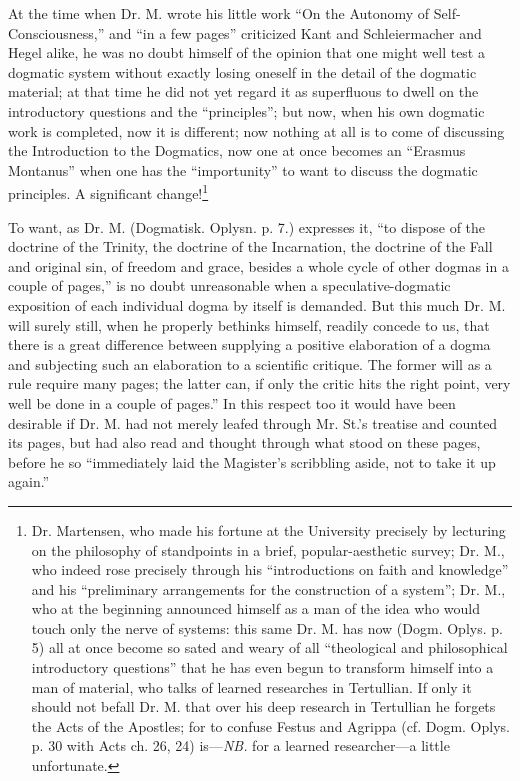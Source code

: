 \documentclass[12pt,a4paper,openany]{book}
\newcommand{\opage}[1]{\marginnote{\footnotesize\textit{[#1]}}}
\begin{document}
At the time when Dr. M. wrote his little work ``On the Autonomy
of Self-Consciousness,'' and ``in a few pages'' criticized
Kant and Schleiermacher and Hegel alike, he was no
doubt himself of the opinion that one might well test
a dogmatic system without exactly losing oneself in the detail of
the dogmatic material; at that time he did not yet regard it
as superfluous to dwell on the introductory questions
and the ``principles''; but now, when his own dogmatic
work is completed, now it is different; now nothing at all
is to come of discussing the Introduction to the Dogmatics,
now one at once becomes an ``Erasmus Montanus'' when one
has the ``importunity'' to want to discuss the dogmatic
principles. A significant change!\footnote[1]{Dr. Martensen, who made his fortune at the University precisely by lecturing on the philosophy of standpoints in a brief, popular-aesthetic survey; Dr. M., who indeed rose precisely through his ``introductions on faith and knowledge'' and his ``preliminary arrangements for the construction of a system''; Dr. M., who at the beginning announced himself as a man of the idea who would touch only the nerve of systems: this same Dr. M. has now (Dogm. Oplys. p. 5) all at once become so sated and weary of all ``theological and philosophical introductory questions'' that he has even begun to transform himself into a man of material, who talks of learned researches in Tertullian. If only it should not befall Dr. M. that over his deep research in Tertullian he forgets the Acts of the Apostles; for to confuse Festus and Agrippa (cf. Dogm. Oplys. p. 30 with Acts ch. 26, 24) is---\textit{NB.} for a learned researcher---a little unfortunate.} %

To want, as Dr. M. (Dogmatisk. Oplysn. p. 7.)
expresses it, ``to dispose of the doctrine of the Trinity, the doctrine of the Incarnation,
the doctrine of the Fall and original sin, of freedom
and grace, besides a whole cycle of other dogmas in
\setcounter{footnote}{0}%
\opage{30}a couple of pages,'' is no doubt unreasonable when a
speculative-dogmatic exposition of each individual dogma by
itself is demanded. But this much Dr. M. will surely still, when he
properly bethinks himself, readily concede to us, that there is a great
difference between supplying a positive elaboration of a
dogma and subjecting such an elaboration to a
scientific critique. The former will as a rule require many
pages; the latter can, if only the critic hits the right
point, very well be done in a couple of pages.'' In this
respect too it would have been desirable if Dr. M. had not merely
leafed through Mr. St.'s treatise and counted its pages, but
had also read and thought through what stood on these pages,
before he so ``immediately laid the Magister's scribbling aside, not
to take it up again.''
\end{document}
